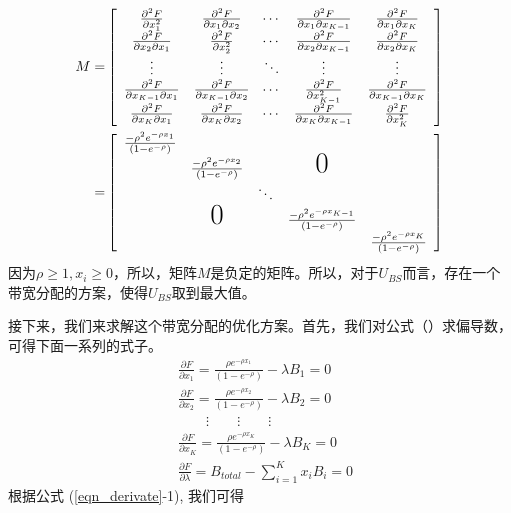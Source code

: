 \begin{eqnarray*}
{M} = & 
\left[
\begin{array}{ccccc}
\frac{\partial ^2F}{\partial x_1 ^2} &\frac{\partial ^2F}{\partial x_1 \partial x_2} & \dotsi & \frac{\partial ^2F}{\partial x_1 \partial x_{K-1}}& \frac{\partial ^2F}{\partial x_1 \partial x_K} \\
\frac{\partial ^2F}{\partial x_2 \partial x_1}& \frac{\partial ^2F}{\partial x_2 ^2}& \dotsi & \frac{\partial ^2F}{\partial x_2 \partial x_{K-1}}&\frac{\partial ^2F}{\partial x_2 \partial x_K}\\
\vdots & \vdots & \ddots & \vdots & \vdots \\
\frac{\partial ^2F}{\partial x_{K-1} \partial x_1 } &\frac{\partial ^2F}{\partial x_{K-1} \partial x_2}&\dotsi &\frac{\partial ^2F}{\partial x_{K-1}^2}&\frac{\partial ^2F}{\partial x_{K-1} \partial x_K}\\
\frac{\partial ^2F}{\partial x_{K} \partial x_1 } &\frac{\partial ^2F}{\partial x_{K} \partial x_2} & \dotsi & \frac{\partial ^2F}{\partial x_{K} \partial x_{K-1}}&\frac{\partial ^2F}{\partial x_K ^2}\\
\end{array}
\right] \\
=&
\left[
\begin{array}{ccccc}
\frac{-\rho^2 e^{-\rho x_1}}{(1-e^{-\rho})} \\
&\frac{-\rho^2 e^{-\rho x_2}}{(1-e^{-\rho})} & & \text{{\huge{0}}}\\
& &\ddots\\
& \text{{\huge{0}}} & & \frac{-\rho^2 e^{-\rho x_{K-1}}}{(1-e^{-\rho})}\\
& & & &\frac{-\rho^2 e^{-\rho x_K}}{(1-e^{-\rho})}
\end{array}
\right] 
\end{eqnarray*}
因为$\rho \ge 1, x_i \ge 0$，所以，矩阵$M$是负定的矩阵。所以，对于$U_{BS}$而言，存在一个带宽分配的方案，使得$U_{BS}$取到最大值。

接下来，我们来求解这个带宽分配的优化方案。首先，我们对公式（）求偏导数，可得下面一系列的式子。
\begin{subequations}
\label{eqn_derivate}
\begin{align} &\frac{\partial F}{\partial x_1} =
\frac{\rho e^{-\rho x_1}}{(1-e^{-\rho})} - \lambda B_1 = 0 \tag{\theequation -1}\\
&\frac{\partial F}{\partial x_2} =
\frac{\rho e^{-\rho x_2}}{(1-e^{-\rho})} - \lambda B_2 = 0 \tag{\theequation -2}\\
\nonumber & \qquad \vdots \qquad \vdots \qquad \vdots \\
&\frac{\partial F}{\partial x_K} =
\frac{\rho e^{-\rho x_K}}{(1-e^{-\rho})} - \lambda B_K = 0 \tag{\theequation -K}\\
&\frac{\partial F}{\partial \lambda} = B_{total} -
\sum^K_{i=1}x_iB_i = 0 \tag{\theequation -K+1}
\end{align}
\end{subequations}
根据公式 (\ref{eqn_derivate}-1), 我们可得

